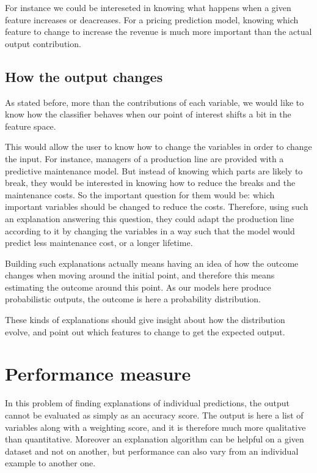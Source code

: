 \documentclass[a4paper,11pt]{kth-mag}
\begin{document}
For instance we could be intereseted in knowing what happens when a given feature increases or deacreases. For a pricing prediction model, knowing which feature to change to increase the revenue is much more important than the actual output contribution.

\subsection{How the output changes}

As stated before, more than the contributions of each variable, we would like to know how the classifier behaves when our point of interest shifts a bit in the feature space.

This would allow the user to know how to change the variables in order to change the input. For instance, managers of a production line are provided with a predictive maintenance model. But instead of knowing which parts are likely to break, they would be interested in knowing how to reduce the breaks and the maintenance costs. So the important question for them would be: which important variables should be changed to reduce the costs. Therefore, using such an explanation answering this question, they could adapt the production line  according to it by changing the variables in a way such that the model would predict less maintenance cost, or a longer lifetime.

Building such explanations actually means having an idea of how the outcome changes when moving around the initial point, and therefore this means estimating the outcome around this point. As our models here produce probabilistic outputs, the outcome is here a probability distribution.

These kinds of explanations should give insight about how the distribution evolve, and point out which features to change to get the expected output.


\section{Performance measure}

In this problem of finding explanations of individual predictions, the output cannot be evaluated as simply as an accuracy score. The output is here a list of variables along with a weighting score, and it is therefore much more qualitative than quantitative. Moreover an explanation algorithm can be helpful on a given dataset and not on another, but performance can also vary from an individual example to another one.
\end{document}

